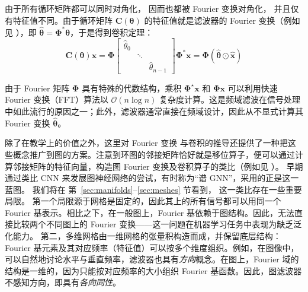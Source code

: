  
 
由于所有循环矩阵都可以同时对角化，  
因而也都被 Fourier 变换对角化，
并且仅有特征值不同。由于循环矩阵 $\mathbf{C}(\boldsymbol{\theta})$ 的特征值就是滤波器的 Fourier 变换（例如见 \cite{bamieh2018discovering}），即 $\hat{\boldsymbol{\theta}} = \boldsymbol{\Phi}^* \boldsymbol{\theta}$，于是得到卷积定理：
$$
\mathbf{C}(\boldsymbol{\theta}) \mathbf{x} = \boldsymbol{\Phi}
\left[  
    \begin{array}{ccc}
    \hat{\theta}_0 &  &  \\
    & \ddots & \\
    & & \hat{\theta}_{n-1}
  \end{array}
   \right]\boldsymbol{\Phi}^*\mathbf{x}
   = \boldsymbol{\Phi} (\hat{\boldsymbol{\theta}} \odot \hat{\mathbf{x}} )
$$
%

由于 Fourier 矩阵 $\boldsymbol{\Phi}$ 具有特殊的代数结构，乘积 $\boldsymbol{\Phi}^\star \mathbf{x}$ 和 $\boldsymbol{\Phi} \mathbf{x}$ 可以利用快速 Fourier 变换（FFT）算法以 $\mathcal{O}(n \log n)$ 复杂度计算。这是频域滤波在信号处理中如此流行的原因之一；此外，滤波器通常直接在频域设计，因此从不显式计算其 Fourier 变换 $\hat{\boldsymbol{\theta}}$。


除了在教学上的价值之外，这里对 Fourier 变换
与卷积的推导还提供了一种把这些概念推广到图的方案。注意到环图的邻接矩阵恰好就是移位算子，便可以通过计算邻接矩阵的特征向量，构造图 Fourier 变换及卷积算子的类比（例如见 \cite{sandryhaila2013discrete}）。
%
早期通过类比 CNN 来发展图神经网络的尝试，有时称为“谱 GNN”，采用的正是这一蓝图。
%
我们将在%
第~\ref{sec:manifolds}--\ref{sec:meshes} 节看到，
这一类比存在一些重要局限。
%
第一个局限源于网格是固定的，因此其上的所有信号都可以用同一个 Fourier 基表示。相比之下，在一般图上，Fourier 基依赖于图结构。因此，无法直接比较两个不同图上的 Fourier 变换——这一问题在机器学习任务中表现为缺乏泛化能力。
%
第二，多维网格由一维网格的张量积构造而成，并保留底层结构：Fourier 基元素及其对应频率（特征值）可以按多个维度组织。例如，在图像中，可以自然地讨论水平与垂直频率，滤波器也具有{\em 方向}概念。在图上，Fourier 域的结构是一维的，因为只能按对应频率的大小组织 Fourier 基函数。因此，图滤波器不感知方向，即具有{\em 各向同性}。



